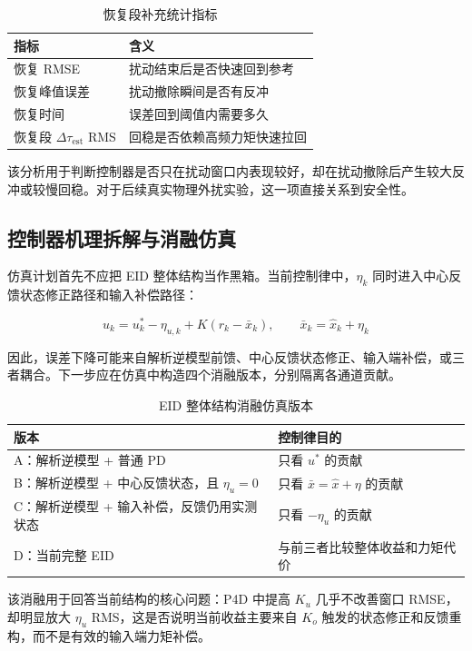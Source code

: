 \documentclass[12pt,a4paper]{ctexart}
\begin{document}
\begin{table}[htbp]
\centering
\footnotesize
\caption{恢复段补充统计指标}
\begin{tabularx}{\textwidth}{YY}
\toprule
指标 & 含义 \\
\midrule
恢复 RMSE & 扰动结束后是否快速回到参考 \\
恢复峰值误差 & 扰动撤除瞬间是否有反冲 \\
恢复时间 & 误差回到阈值内需要多久 \\
恢复段 $\Delta\tau_\mathrm{est}$ RMS & 回稳是否依赖高频力矩快速拉回 \\
\bottomrule
\end{tabularx}
\end{table}

该分析用于判断控制器是否只在扰动窗口内表现较好，却在扰动撤除后产生较大反冲或较慢回稳。对于后续真实物理外扰实验，这一项直接关系到安全性。

\subsection{控制器机理拆解与消融仿真}

仿真计划首先不应把 EID 整体结构当作黑箱。当前控制律中，$\eta_k$ 同时进入中心反馈状态修正路径和输入补偿路径：

\[
u_k=u_k^*-\eta_{u,k}+K(r_k-\bar{x}_k),
\qquad
\bar{x}_k=\hat{x}_k+\eta_k
\]

因此，误差下降可能来自解析逆模型前馈、中心反馈状态修正、输入端补偿，或三者耦合。下一步应在仿真中构造四个消融版本，分别隔离各通道贡献。

\begin{table}[htbp]
\centering
\footnotesize
\caption{EID 整体结构消融仿真版本}
\begin{tabularx}{\textwidth}{YY}
\toprule
版本 & 控制律目的 \\
\midrule
A：解析逆模型 + 普通 PD & 只看 $u^*$ 的贡献 \\
B：解析逆模型 + 中心反馈状态，且 $\eta_u=0$ & 只看 $\bar{x}=\hat{x}+\eta$ 的贡献 \\
C：解析逆模型 + 输入补偿，反馈仍用实测状态 & 只看 $-\eta_u$ 的贡献 \\
D：当前完整 EID & 与前三者比较整体收益和力矩代价 \\
\bottomrule
\end{tabularx}
\end{table}

该消融用于回答当前结构的核心问题：P4D 中提高 $K_u$ 几乎不改善窗口 RMSE，却明显放大 $\eta_u$ RMS，这是否说明当前收益主要来自 $K_o$ 触发的状态修正和反馈重构，而不是有效的输入端力矩补偿。
\end{document}

